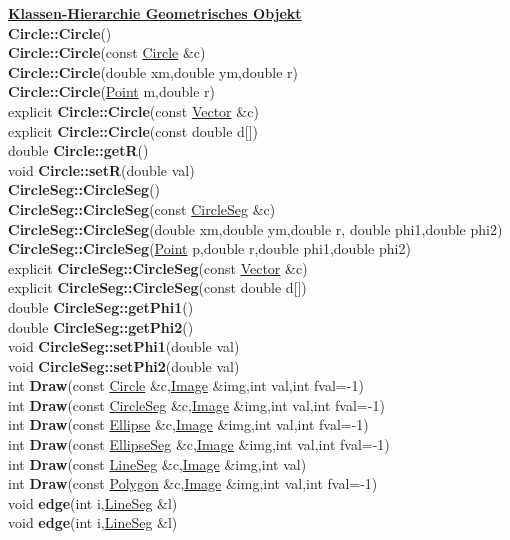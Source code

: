 \documentclass[10pt,titlepage]{article}
\newcommand{\subtitle}[1]{{\noindent\bf#1}}
\def\functionlistentry#1#2#3#4#5#6{\noindent #1 {\bf #2}(#3) \dotfill #6\\}
\begin{document}
{{\subtitle{\hyperlink{SECTION:geoObject}{Klassen-Hierarchie Geometrisches Objekt}}\\
\functionlistentry{}{Circle::Circle}{}{514}{geoObject}{}
\functionlistentry{}{Circle::Circle}{const \hyperlink{Circle}{Circle} \&c}{515}{geoObject}{}
\functionlistentry{}{Circle::Circle}{double xm,double ym,double r}{516}{geoObject}{}
\functionlistentry{}{Circle::Circle}{\hyperlink{Point}{Point} m,double r}{517}{geoObject}{}
\functionlistentry{explicit}{Circle::Circle}{const \hyperlink{Vector}{Vector} \&c}{518}{geoObject}{}
\functionlistentry{explicit}{Circle::Circle}{const double d[]}{519}{geoObject}{}
\functionlistentry{double}{Circle::getR}{}{520}{geoObject}{}
\functionlistentry{void}{Circle::setR}{double val}{521}{geoObject}{}
\functionlistentry{}{CircleSeg::CircleSeg}{}{522}{geoObject}{}
\functionlistentry{}{CircleSeg::CircleSeg}{const \hyperlink{CircleSeg}{CircleSeg} \&c}{523}{geoObject}{}
\functionlistentry{}{CircleSeg::CircleSeg}{double xm,double ym,double r, double phi1,double phi2}{524}{geoObject}{}
\functionlistentry{}{CircleSeg::CircleSeg}{\hyperlink{Point}{Point} p,double r,double phi1,double phi2}{525}{geoObject}{}
\functionlistentry{explicit}{CircleSeg::CircleSeg}{const \hyperlink{Vector}{Vector} \&c}{526}{geoObject}{}
\functionlistentry{explicit}{CircleSeg::CircleSeg}{const double d[]}{527}{geoObject}{}
\functionlistentry{double }{CircleSeg::getPhi1}{}{528}{geoObject}{}
\functionlistentry{double}{CircleSeg::getPhi2}{}{530}{geoObject}{}
\functionlistentry{void}{CircleSeg::setPhi1}{double val}{529}{geoObject}{}
\functionlistentry{void}{CircleSeg::setPhi2}{double val}{531}{geoObject}{}
\functionlistentry{int}{Draw}{const \hyperlink{Circle}{Circle} \&c,\hyperlink{Image}{Image} \&img,int val,int fval=-1}{623}{geoObject}{}
\functionlistentry{int}{Draw}{const \hyperlink{CircleSeg}{CircleSeg} \&c,\hyperlink{Image}{Image} \&img,int val,int fval=-1}{624}{geoObject}{}
\functionlistentry{int}{Draw}{const \hyperlink{Ellipse}{Ellipse} \&c,\hyperlink{Image}{Image} \&img,int val,int fval=-1}{625}{geoObject}{}
\functionlistentry{int}{Draw}{const \hyperlink{EllipseSeg}{EllipseSeg} \&c,\hyperlink{Image}{Image} \&img,int val,int fval=-1}{626}{geoObject}{}
\functionlistentry{int}{Draw}{const \hyperlink{LineSeg}{LineSeg} \&c,\hyperlink{Image}{Image} \&img,int val}{627}{geoObject}{}
\functionlistentry{int}{Draw}{const \hyperlink{Polygon}{Polygon} \&c,\hyperlink{Image}{Image} \&img,int val,int fval=-1}{628}{geoObject}{}
\functionlistentry{void}{edge}{int i,\hyperlink{LineSeg}{LineSeg} \&l}{601}{geoObject}{}
\functionlistentry{void}{edge}{int i,\hyperlink{LineSeg}{LineSeg} \&l}{620}{geoObject}{}
}}
\end{document}

